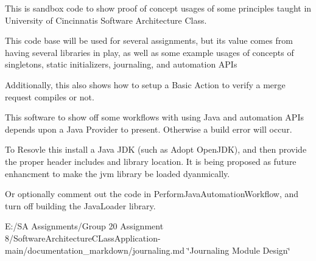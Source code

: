 This is sandbox code to show proof of concept usages of some principles taught in University of Cincinnati\textquotesingle{}s Software Architecture Class.

This code base will be used for several assignments, but it\textquotesingle{}s value comes from having several libraries in play, as well as some example usages of concepts of singletons, static initializers, journaling, and automation APIs

Additionally, this also shows how to setup a Basic Action to verify a merge request compiles or not.

This software to show off some workflows with using Java and automation APIs depends upon a Java Provider to present. Otherwise a build error will occur.

To Resovle this install a Java JDK (such as Adopt Open\+JDK), and then provide the proper header includes and library location. It is being proposed as future enhancment to make the jvm library be loaded dyanmically.

Or optionally comment out the code in Perform\+Java\+Automation\+Workflow, and turn off building the Java\+Loader library.

E\+:/\+SA Assignments/\+Group 20 Assignment 8/\+Software\+Architecture\+CLass\+Application-\/main/documentation\+\_\+markdown/journaling.\+md \char`\"{}\+Journaling Module Design\char`\"{} 